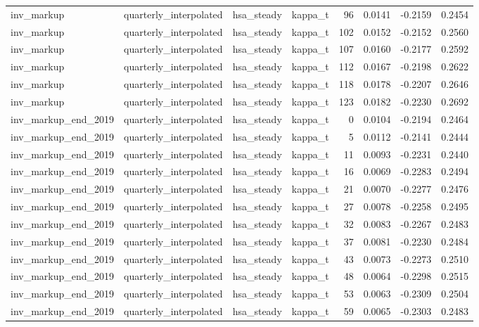 \begin{tabular}{llllrrrr}
inv\_markup & quarterly\_interpolated & hsa\_steady & kappa\_t & 96 & 0.0141 & -0.2159 & 0.2454 \\
inv\_markup & quarterly\_interpolated & hsa\_steady & kappa\_t & 102 & 0.0152 & -0.2152 & 0.2560 \\
inv\_markup & quarterly\_interpolated & hsa\_steady & kappa\_t & 107 & 0.0160 & -0.2177 & 0.2592 \\
inv\_markup & quarterly\_interpolated & hsa\_steady & kappa\_t & 112 & 0.0167 & -0.2198 & 0.2622 \\
inv\_markup & quarterly\_interpolated & hsa\_steady & kappa\_t & 118 & 0.0178 & -0.2207 & 0.2646 \\
inv\_markup & quarterly\_interpolated & hsa\_steady & kappa\_t & 123 & 0.0182 & -0.2230 & 0.2692 \\
inv\_markup\_end\_2019 & quarterly\_interpolated & hsa\_steady & kappa\_t & 0 & 0.0104 & -0.2194 & 0.2464 \\
inv\_markup\_end\_2019 & quarterly\_interpolated & hsa\_steady & kappa\_t & 5 & 0.0112 & -0.2141 & 0.2444 \\
inv\_markup\_end\_2019 & quarterly\_interpolated & hsa\_steady & kappa\_t & 11 & 0.0093 & -0.2231 & 0.2440 \\
inv\_markup\_end\_2019 & quarterly\_interpolated & hsa\_steady & kappa\_t & 16 & 0.0069 & -0.2283 & 0.2494 \\
inv\_markup\_end\_2019 & quarterly\_interpolated & hsa\_steady & kappa\_t & 21 & 0.0070 & -0.2277 & 0.2476 \\
inv\_markup\_end\_2019 & quarterly\_interpolated & hsa\_steady & kappa\_t & 27 & 0.0078 & -0.2258 & 0.2495 \\
inv\_markup\_end\_2019 & quarterly\_interpolated & hsa\_steady & kappa\_t & 32 & 0.0083 & -0.2267 & 0.2483 \\
inv\_markup\_end\_2019 & quarterly\_interpolated & hsa\_steady & kappa\_t & 37 & 0.0081 & -0.2230 & 0.2484 \\
inv\_markup\_end\_2019 & quarterly\_interpolated & hsa\_steady & kappa\_t & 43 & 0.0073 & -0.2273 & 0.2510 \\
inv\_markup\_end\_2019 & quarterly\_interpolated & hsa\_steady & kappa\_t & 48 & 0.0064 & -0.2298 & 0.2515 \\
inv\_markup\_end\_2019 & quarterly\_interpolated & hsa\_steady & kappa\_t & 53 & 0.0063 & -0.2309 & 0.2504 \\
inv\_markup\_end\_2019 & quarterly\_interpolated & hsa\_steady & kappa\_t & 59 & 0.0065 & -0.2303 & 0.2483 \\

\end{tabular}
